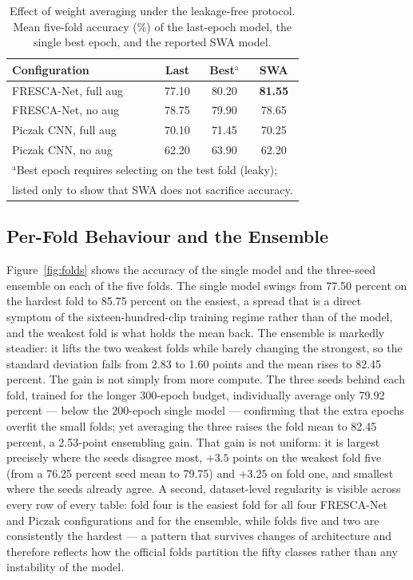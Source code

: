 \documentclass[conference]{IEEEtran}
\begin{document}
\begin{table}[t]
\caption{Effect of weight averaging under the leakage-free protocol. Mean five-fold accuracy (\%) of the last-epoch model, the single best epoch, and the reported SWA model.}
\label{tab:swa}
\begin{center}
\renewcommand{\arraystretch}{1.15}
\begin{tabular}{|l|c|c|c|}
\hline
\textbf{Configuration} & \textbf{Last} & \textbf{Best$^{\mathrm{a}}$} & \textbf{SWA} \\
\hline
FRESCA-Net, full aug & 77.10 & 80.20 & \textbf{81.55} \\
FRESCA-Net, no aug & 78.75 & 79.90 & 78.65 \\
Piczak CNN, full aug & 70.10 & 71.45 & 70.25 \\
Piczak CNN, no aug & 62.20 & 63.90 & 62.20 \\
\hline
\multicolumn{4}{l}{\footnotesize $^{\mathrm{a}}$Best epoch requires selecting on the test fold (leaky);} \\
\multicolumn{4}{l}{\footnotesize listed only to show that SWA does not sacrifice accuracy.} \\
\end{tabular}
\end{center}
\end{table}

\subsection{Per-Fold Behaviour and the Ensemble}
Figure~\ref{fig:folds} shows the accuracy of the single model and the three-seed ensemble on each of the five folds. The single model swings from 77.50 percent on the hardest fold to 85.75 percent on the easiest, a spread that is a direct symptom of the sixteen-hundred-clip training regime rather than of the model, and the weakest fold is what holds the mean back. The ensemble is markedly steadier: it lifts the two weakest folds while barely changing the strongest, so the standard deviation falls from 2.83 to 1.60 points and the mean rises to 82.45 percent. The gain is not simply from more compute. The three seeds behind each fold, trained for the longer 300-epoch budget, individually average only 79.92 percent --- below the 200-epoch single model --- confirming that the extra epochs overfit the small folds; yet averaging the three raises the fold mean to 82.45 percent, a 2.53-point ensembling gain. That gain is not uniform: it is largest precisely where the seeds disagree most, $+3.5$ points on the weakest fold five (from a 76.25 percent seed mean to 79.75) and $+3.25$ on fold one, and smallest where the seeds already agree. A second, dataset-level regularity is visible across every row of every table: fold four is the easiest fold for all four FRESCA-Net and Piczak configurations and for the ensemble, while folds five and two are consistently the hardest --- a pattern that survives changes of architecture and therefore reflects how the official folds partition the fifty classes rather than any instability of the model.
\end{document}

